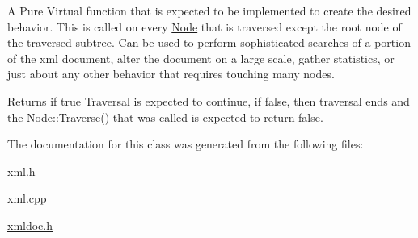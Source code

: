 A Pure Virtual function that is expected to be implemented to create the desired behavior.  This is called on every \hyperlink{classphys_1_1xml_1_1Node}{Node} that is traversed except the root node of the traversed subtree. Can be used to perform sophisticated searches of a portion of the xml document, alter the document on a large scale, gather statistics, or just about any other behavior that requires touching many nodes. 

\begin{DoxyReturn}{Returns}
if true Traversal is expected to continue, if false, then traversal ends and the \hyperlink{classphys_1_1xml_1_1Node_a0029d08d3689c36d882ada0c0c9cf6e9}{Node::Traverse()} that was called is expected to return false. 
\end{DoxyReturn}


The documentation for this class was generated from the following files:\begin{DoxyCompactItemize}
\item 
\hyperlink{xml_8h}{xml.h}\item 
xml.cpp\item 
\hyperlink{xmldoc_8h}{xmldoc.h}\end{DoxyCompactItemize}
